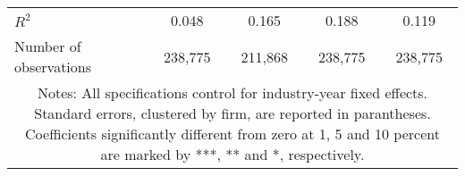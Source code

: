 \begin{tabular}{lcccc}
\\
	$R^2$ 
				& 0.048 
				& 0.165 
				& 0.188 
				& 0.119 \\
	Number of observations 
				& 238,775 
				& 211,868 
				& 238,775 
				& 238,775 \\
\hline \hline
\multicolumn{ 5 }{c}{\begin{minipage}{\textwidth}
\small Notes: All specifications control for industry-year fixed effects. Standard errors, clustered by firm, are reported in parantheses. Coefficients significantly different from zero at 1, 5 and 10 percent are marked by ***, ** and *, respectively.

  \end{minipage} } \\
\end{tabular}